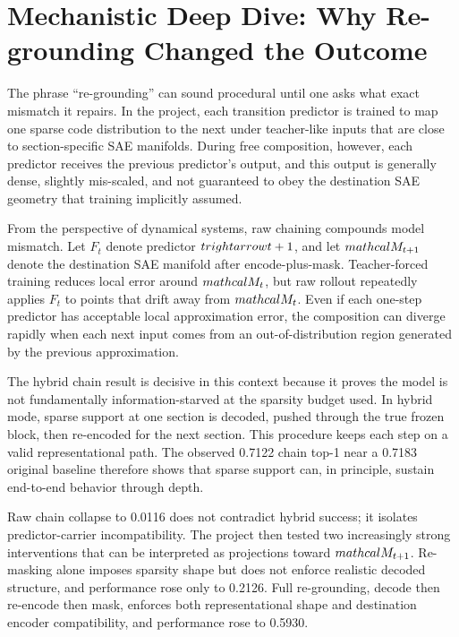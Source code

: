 \documentclass[11pt]{article}
\begin{document}
\section{Mechanistic Deep Dive: Why Re-grounding Changed the Outcome}
The phrase ``re-grounding'' can sound procedural until one asks what exact mismatch it repairs. In the project, each transition predictor is trained to map one sparse code distribution to the next under teacher-like inputs that are close to section-specific SAE manifolds. During free composition, however, each predictor receives the previous predictor's output, and this output is generally dense, slightly mis-scaled, and not guaranteed to obey the destination SAE geometry that training implicitly assumed.

From the perspective of dynamical systems, raw chaining compounds model mismatch. Let $F_t$ denote predictor $t\\rightarrow t+1$, and let $\\mathcal{M}_{t+1}$ denote the destination SAE manifold after encode-plus-mask. Teacher-forced training reduces local error around $\\mathcal{M}_t$, but raw rollout repeatedly applies $F_t$ to points that drift away from $\\mathcal{M}_t$. Even if each one-step predictor has acceptable local approximation error, the composition can diverge rapidly when each next input comes from an out-of-distribution region generated by the previous approximation.

The hybrid chain result is decisive in this context because it proves the model is not fundamentally information-starved at the sparsity budget used. In hybrid mode, sparse support at one section is decoded, pushed through the true frozen block, then re-encoded for the next section. This procedure keeps each step on a valid representational path. The observed 0.7122 chain top-1 near a 0.7183 original baseline therefore shows that sparse support can, in principle, sustain end-to-end behavior through depth.

Raw chain collapse to 0.0116 does not contradict hybrid success; it isolates predictor-carrier incompatibility. The project then tested two increasingly strong interventions that can be interpreted as projections toward $\\mathcal{M}_{t+1}$. Re-masking alone imposes sparsity shape but does not enforce realistic decoded structure, and performance rose only to 0.2126. Full re-grounding, decode then re-encode then mask, enforces both representational shape and destination encoder compatibility, and performance rose to 0.5930.
\end{document}
